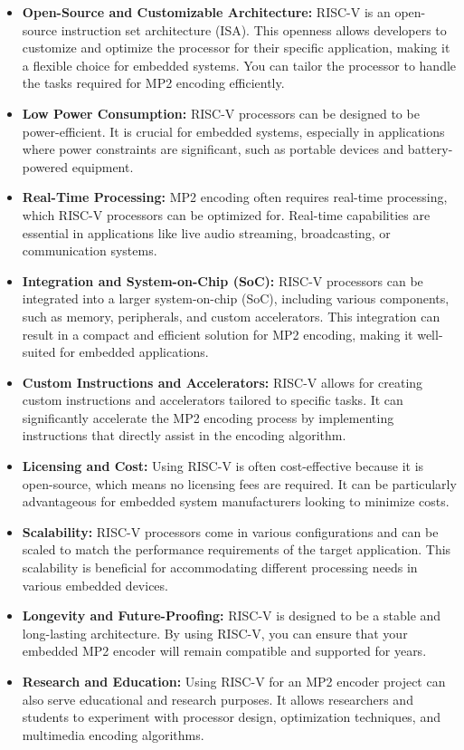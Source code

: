 \begin{itemize}
    \item \textbf{Open-Source and Customizable Architecture:} RISC-V is an open-source instruction set architecture (ISA). This openness allows developers to customize and optimize the processor for their specific application, making it a flexible choice for embedded systems. You can tailor the processor to handle the tasks required for MP2 encoding efficiently.
    \item \textbf{Low Power Consumption:} RISC-V processors can be designed to be power-efficient. It is crucial for embedded systems, especially in applications where power constraints are significant, such as portable devices and battery-powered equipment.
    \item \textbf{Real-Time Processing:} MP2 encoding often requires real-time processing, which RISC-V processors can be optimized for. Real-time capabilities are essential in applications like live audio streaming, broadcasting, or communication systems.
    \item \textbf{Integration and System-on-Chip (SoC):} RISC-V processors can be integrated into a larger system-on-chip (SoC), including various components, such as memory, peripherals, and custom accelerators. This integration can result in a compact and efficient solution for MP2 encoding, making it well-suited for embedded applications.
    \item \textbf{Custom Instructions and Accelerators:} RISC-V allows for creating custom instructions and accelerators tailored to specific tasks. It can significantly accelerate the MP2 encoding process by implementing instructions that directly assist in the encoding algorithm.
    \item \textbf{Licensing and Cost:} Using RISC-V is often cost-effective because it is open-source, which means no licensing fees are required. It can be particularly advantageous for embedded system manufacturers looking to minimize costs.
    \item \textbf{Scalability:} RISC-V processors come in various configurations and can be scaled to match the performance requirements of the target application. This scalability is beneficial for accommodating different processing needs in various embedded devices.
    \item \textbf{Longevity and Future-Proofing:} RISC-V is designed to be a stable and long-lasting architecture. By using RISC-V, you can ensure that your embedded MP2 encoder will remain compatible and supported for years.
    \item \textbf{Research and Education:} Using RISC-V for an MP2 encoder project can also serve educational and research purposes. It allows researchers and students to experiment with processor design, optimization techniques, and multimedia encoding algorithms.
\end{itemize}

